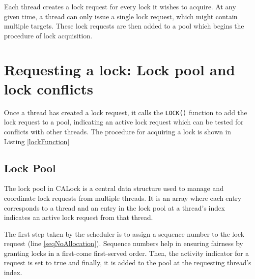 Each thread creates a lock request for every lock it wishes to acquire. At any given time, a thread can only issue a single lock request, which might contain multiple targets. These lock requests are then added to a pool which begins the procedure of lock acquisition. 



\section{Requesting a lock: Lock pool and lock conflicts}
Once a thread has created a lock request, it calls the \lstinline|LOCK()| function to add the lock request to a pool, indicating an active lock request which can be tested for conflicts with other threads. The procedure for acquiring a lock is shown in Listing \ref{lockFunction}

\subsection{Lock Pool}
The lock pool in CALock is a central data structure used to manage and coordinate lock requests from multiple threads. It is an array where each entry corresponds to a thread and an entry in the lock pool at a thread's index indicates an active lock request from that thread.

The first step taken by the scheduler is to assign a sequence number to the lock request (line \ref{seqNoAllocation}). Sequence numbers help in ensuring fairness by granting locks in a first-come first-served order. Then, the activity indicator for a request is set to true and finally, it is added to the pool at the requesting thread's index. 



